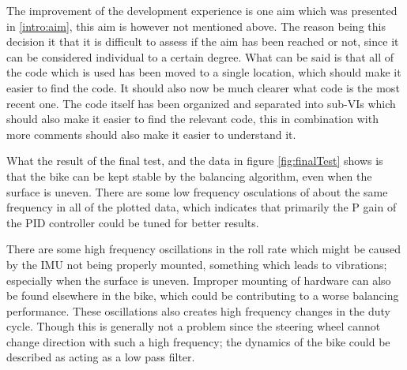 The improvement of the development experience is one aim which was presented in \ref{intro:aim}, this aim is however not mentioned above. The reason being this decision it that it is difficult to assess if the aim has been reached or not, since it can be considered individual to a certain degree. What can be said is that all of the code which is used has been moved to a single location, which should make it easier to find the code. It should also now be much clearer what code is the most recent one. The code itself has been organized and separated into sub-VIs which should also make it easier to find the relevant code, this in combination with more comments should also make it easier to understand it.

What the result of the final test, and the data in figure \ref{fig:finalTest} shows is that the bike can be kept stable by the balancing algorithm, even when the surface is uneven. There are some low frequency osculations of about the same frequency in all of the plotted data, which indicates that primarily the P gain of the PID controller could be tuned for better results.

There are some high frequency oscillations in the roll rate which might be caused by the IMU not being properly mounted, something which leads to vibrations; especially when the surface is uneven. Improper mounting of hardware can also be found elsewhere in the bike, which could be contributing to a worse balancing performance. These oscillations also creates high frequency changes in the duty cycle. Though this is generally not a problem since the steering wheel cannot change direction with such a high frequency; the dynamics of the bike could be described as acting as a low pass filter.
